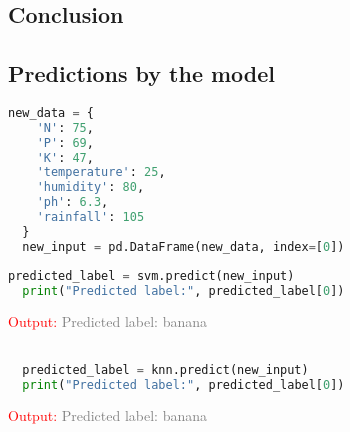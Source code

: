 \subsection{Conclusion}
\subsection*{Predictions by the model}
\textcolor{green}{\hspace{0.5cm}{Using KNN  Algorithm:}}
\begin{lstlisting}[language=Python]
  new_data = {
    'N': 75,  
    'P': 69,  
    'K': 47, 
    'temperature': 25,  
    'humidity': 80,  
    'ph': 6.3,  
    'rainfall': 105  
  }
  new_input = pd.DataFrame(new_data, index=[0])
\end{lstlisting}
\begin{lstlisting}[language=Python]
  predicted_label = svm.predict(new_input)
  print("Predicted label:", predicted_label[0])

\end{lstlisting}
\hspace{2in}\textcolor{red}{Output:}
\newline
\hspace{2in}\textcolor{grey}{Predicted label: banana}
\newpage
\textcolor{green}{\hspace{0.5cm}{Using SVM Algorithm:}}
\begin{lstlisting}[language=Python]

  predicted_label = knn.predict(new_input)
  print("Predicted label:", predicted_label[0])

\end{lstlisting}
\hspace{2in}\textcolor{red}{Output:}
\newline
\hspace{2in}\textcolor{grey}{Predicted label: banana}

\newline

